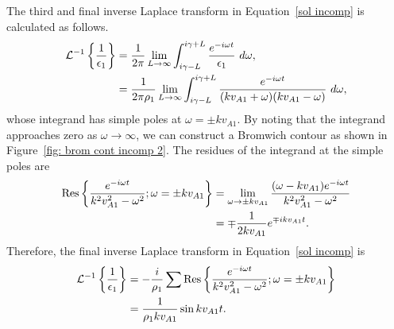 \documentclass[12pt, draft]{../style-files/ociamthesis}
\begin{document}
The third and final inverse Laplace transform in Equation~\eqref{sol incomp} is calculated as follows.
\begin{align}
\mathcal{L}^{-1}\left\{ \frac{1}{\epsilon_1} \right\} &= \frac{1}{2\pi}\lim_{L \to \infty} \int_{i\gamma - L}^{i\gamma + L} \frac{e^{-i\omega t}}{\epsilon_1} ~d\omega, \notag \\
&= \frac{1}{2\pi\rho_1}\lim_{L \to \infty} \int_{i\gamma - L}^{i\gamma + L} \frac{e^{-i\omega t}}{(kv_{A1} + \omega)(kv_{A1} - \omega)} ~d\omega,
\end{align}
whose integrand has simple poles at $\omega = \pm k v_{A1}$. By noting that the integrand approaches zero as $\omega \to \infty$, we can construct a Bromwich contour as shown in Figure~\ref{fig: brom cont incomp 2}. The residues of the integrand at the simple poles are
\begin{align}
\mathrm{Res}\left\{\frac{e^{-i\omega t}}{k^2v_{A1}^2 - \omega^2}; \omega = \pm kv_{A1} \right\} &= 
\lim_{\omega \to \pm kv_{A1}} \frac{(\omega - kv_{A1}) e^{-i\omega t}}{k^2v_{A1}^2 - \omega^2} \notag \\ 
&= \mp \frac{1}{2kv_{A1}} e^{\mp ikv_{A1} t}.
\end{align}
Therefore, the final inverse Laplace transform in Equation~\eqref{sol incomp} is
\begin{align}
\mathcal{L}^{-1}\left\{ \frac{1}{\epsilon_1} \right\} &= -\frac{i}{\rho_1} \sum \mathrm{Res} \left\{ \frac{e^{-i\omega t}}{k^2v_{A1}^2 - \omega^2}; \omega = \pm kv_{A1} \right\} \notag \\
&= \frac{1}{\rho_1kv_{A1}} \sin{kv_{A1}t}.
\end{align}
\end{document}

